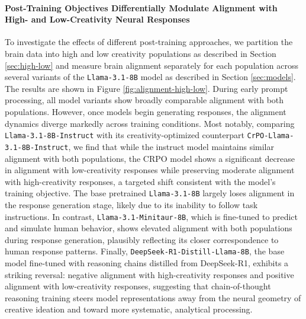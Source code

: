 \paragraph{Post-Training Objectives Differentially Modulate Alignment with High- and Low-Creativity Neural Responses}
To investigate the effects of different post-training approaches, we partition the brain data into high and low creativity populations as described in Section \ref{sec:high-low} and measure brain alignment separately for each population across several variants of the \texttt{Llama-3.1-8B} model as described in Section \ref{sec:models}. The results are shown in Figure \ref{fig:alignment-high-low}. During early prompt processing, all model variants show broadly comparable alignment with both populations. However, once models begin generating responses, the alignment dynamics diverge markedly across training conditions. Most notably, comparing \texttt{Llama-3.1-8B-Instruct} with its creativity-optimized counterpart \texttt{CrPO-Llama-3.1-8B-Instruct}, we find that while the instruct model maintains similar alignment with both populations, the CRPO model shows a significant decrease in alignment with low-creativity responses while preserving moderate alignment with high-creativity responses, a targeted shift consistent with the model's training objective. The base pretrained \texttt{Llama-3.1-8B} largely loses alignment in the response generation stage, likely due to its inability to follow task instructions. In contrast, \texttt{Llama-3.1-Minitaur-8B}, which is fine-tuned to predict and simulate human behavior, shows elevated alignment with both populations during response generation, plausibly reflecting its closer correspondence to human response patterns. Finally, \texttt{DeepSeek-R1-Distill-Llama-8B}, the base model fine-tuned with reasoning chains distilled from DeepSeek-R1, exhibits a striking reversal: negative alignment with high-creativity responses and positive alignment with low-creativity responses, suggesting that chain-of-thought reasoning training steers model representations away from the neural geometry of creative ideation and toward more systematic, analytical processing.